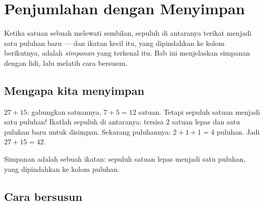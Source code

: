 \chapter{Penjumlahan dengan Menyimpan}\label{ch:g2:addition}

Ketika satuan sebuah  melewati sembilan, sepuluh di antaranya
terikat menjadi satu puluhan baru --- dan ikatan kecil itu, yang
dipindahkan ke kolom berikutnya, adalah \emph{simpanan} yang
terkenal itu. Bab ini menjelaskan simpanan dengan lidi, lalu melatih
cara bersusun.

\section{Mengapa kita menyimpan}

\begin{example}\label{ex:g2:addition:bundle}
$27 + 15$: gabungkan satuannya, $7 + 5 = 12$ satuan. Tetapi sepuluh
satuan menjadi satu puluhan! Ikatlah sepuluh di antaranya: tersisa
$2$ satuan lepas dan satu puluhan baru untuk disimpan. Sekarang
puluhannya: $2 + 1 + 1 = 4$ puluhan. Jadi $27 + 15 = 42$.
\end{example}

\begin{omfigure}

{\small Simpanan adalah sebuah ikatan: sepuluh satuan lepas menjadi
satu puluhan, yang dipindahkan ke kolom puluhan.}
\end{omfigure}

\section{Cara bersusun}

